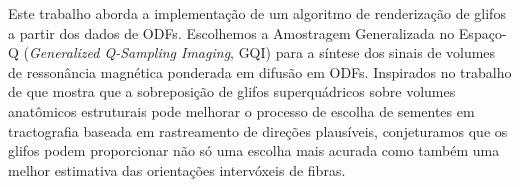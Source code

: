 \documentclass[
    12pt,                %
    oneside,            %
    a4paper,            %
    english,            %
    french,                %
    spanish,            %
    brazil                %
    ]{abntex2}
\begin{document}
Este trabalho aborda a implementação de um algoritmo de renderização de glifos a partir dos dados de ODFs. Escolhemos a Amostragem Generalizada no Espaço-Q (\textit{Generalized Q-Sampling Imaging}, GQI) para a síntese dos sinais de volumes de ressonância magnética ponderada em difusão em ODFs. 
Inspirados no trabalho de  que mostra que a sobreposição de glifos superquádricos sobre volumes anatômicos estruturais pode melhorar o processo de escolha de sementes em tractografia baseada em rastreamento de direções plausíveis, conjeturamos que os glifos podem proporcionar não só uma escolha mais acurada como também uma melhor estimativa das orientações intervóxeis de fibras.





\end{document}

